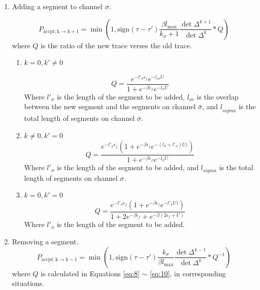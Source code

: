\begin{enumerate}
  \item Adding a segment to channel $\sigma$.

    \begin{equation}
      P_\mathrm{accpt:k\rightarrow k+1}=\min\left(1,\mathrm{sign}(\tau-\tau')
        \frac{\beta l_\mathrm{max}}{k_\sigma +1} \frac{\det\Delta^{k+1}}{\det\Delta^k}
        *Q
      \right)
\end{equation}
where $Q$ is the ratio of the new trace verses the old trace. 

    \begin{enumerate}
    \item{$k=0,k'\neq 0$}

      \begin{equation}
        \label{eq:8}
        Q=
        \frac{e^{-l'_\sigma\epsilon_f}e^{-l_{ov}U}}
        {1+e^{-\beta\epsilon_f}e^{-l_{\bar\sigma} U}}
      \end{equation}
      Where $l'_\sigma$ is the length of the segment to be added, 
      $l_{ov}$ is the overlap between the new segment and the segments on channel $\bar\sigma$,
      and $l_{\bar{sigma}}$ is the total length of segments on channel $\bar\sigma$.

    \item{$k\neq 0,k'=0$}
      \begin{equation}
        \label{eq:9}
        Q=
        \frac{e^{-l'_{\sigma}\epsilon_f}(1+e^{-\beta\epsilon_f}e^{-(l_\sigma+l'_{\sigma})U)})}
        {1+e^{-\beta\epsilon_f}e^{-l_{\sigma} U}}
      \end{equation}
      Where $l'_\sigma$ is the length of the segment to be added, 
      and $l_{sigma}$ is the total length of segments on channel $\sigma$.
    
    
  \item{$k=0,k'=0$}
    \begin{equation}
        \label{eq:10}
        Q=
        \frac{e^{-l'_{\sigma}\epsilon_f}(1+e^{-\beta\epsilon_f}e^{-l'_{\sigma} U)})}
        {1+2e^{-\beta\epsilon_f}+e^{-\beta(2\epsilon_f+U)}}
      \end{equation}
      Where $l'_\sigma$ is the length of the segment to be added.
   
    \end{enumerate}

  \item Removing a segment.
    \begin{equation}
      P_\mathrm{accpt:k\rightarrow k-1}=\min\left(1,\mathrm{sign}(\tau-\tau')
        \frac{k_\sigma}{\beta l_\mathrm{max}} \frac{\det\Delta^{k-1}}{\det\Delta^k}
        *Q^{-1}
      \right)
    \end{equation}
    where $Q$ is calculated in Equations \ref{eq:8} $\sim$ \ref{eq:10}, in
    corresponding situations.
 

\end{enumerate}
